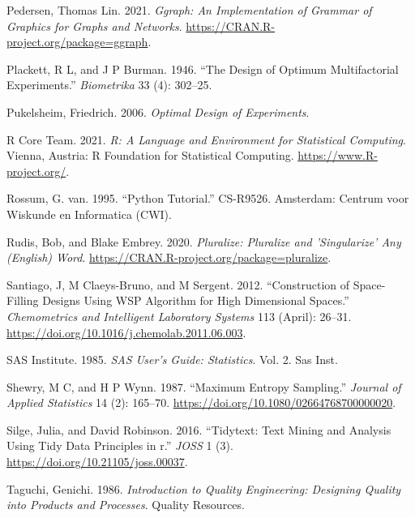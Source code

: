 \begin{CSLReferences}{1}{0}
\leavevmode{}%
Pedersen, Thomas Lin. 2021. \emph{Ggraph: An Implementation of Grammar of Graphics for Graphs and Networks}. \url{https://CRAN.R-project.org/package=ggraph}.

\leavevmode{}%
Plackett, R L, and J P Burman. 1946. {``The Design of Optimum Multifactorial Experiments.''} \emph{Biometrika} 33 (4): 302--25.

\leavevmode{}%
Pukelsheim, Friedrich. 2006. \emph{Optimal Design of Experiments}.

\leavevmode{}%
R Core Team. 2021. \emph{R: A Language and Environment for Statistical Computing}. Vienna, Austria: R Foundation for Statistical Computing. \url{https://www.R-project.org/}.

\leavevmode{}%
Rossum, G. van. 1995. {``Python Tutorial.''} CS-R9526. Amsterdam: Centrum voor Wiskunde en Informatica (CWI).

\leavevmode{}%
Rudis, Bob, and Blake Embrey. 2020. \emph{Pluralize: Pluralize and 'Singularize' Any (English) Word}. \url{https://CRAN.R-project.org/package=pluralize}.

\leavevmode{}%
Santiago, J, M Claeys-Bruno, and M Sergent. 2012. {``Construction of Space-Filling Designs Using {WSP} Algorithm for High Dimensional Spaces.''} \emph{Chemometrics and Intelligent Laboratory Systems} 113 (April): 26--31. \url{https://doi.org/10.1016/j.chemolab.2011.06.003}.

\leavevmode{}%
SAS Institute. 1985. \emph{SAS User's Guide: Statistics}. Vol. 2. Sas Inst.

\leavevmode{}%
Shewry, M C, and H P Wynn. 1987. {``Maximum Entropy Sampling.''} \emph{Journal of Applied Statistics} 14 (2): 165--70. \url{https://doi.org/10.1080/02664768700000020}.

\leavevmode{}%
Silge, Julia, and David Robinson. 2016. {``Tidytext: Text Mining and Analysis Using Tidy Data Principles in r.''} \emph{JOSS} 1 (3). \url{https://doi.org/10.21105/joss.00037}.

\leavevmode{}%
Taguchi, Genichi. 1986. \emph{Introduction to Quality Engineering: Designing Quality into Products and Processes}. Quality Resources.


\end{CSLReferences}

